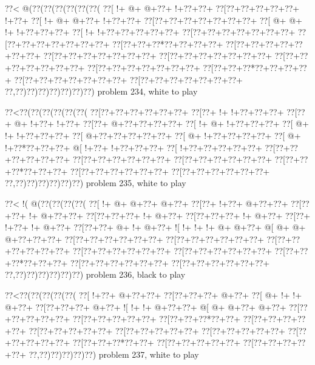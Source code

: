 \vbox{\vbox{\goo
\0??<\- @(\0??(\0??(\0??(\0??(\0??(\0??(
\0??[\- !+\- @+\- @+\0??+\- !+\0??+\0??+
\0??[\0??+\0??+\0??+\0??+\0??+\- !+\0??+
\0??[\- !+\- @+\- @+\0??+\- !+\0??+\0??+
\0??[\0??+\0??+\0??+\0??+\0??+\0??+\0??+
\0??[\- @+\- @+\- !+\- !+\0??+\0??+\0??+
\0??[\- !+\- !+\0??+\0??+\0??+\0??+\0??+
\0??[\0??+\0??+\0??+\0??+\0??+\0??+\0??+
\0??[\0??+\0??+\0??+\0??+\0??+\0??+\0??+
\0??[\0??+\0??+\0??*\0??+\0??+\0??+\0??+
\0??[\0??+\0??+\0??+\0??+\0??+\0??+\0??+
\0??[\0??+\0??+\0??+\0??+\0??+\0??+\0??+
\0??[\0??+\0??+\0??+\0??+\0??+\0??+\0??+
\0??[\0??+\0??+\0??+\0??+\0??+\0??+\0??+
\0??[\0??+\0??+\0??+\0??+\0??+\0??+\0??+
\0??[\0??+\0??+\0??*\0??+\0??+\0??+\0??+
\0??[\0??+\0??+\0??+\0??+\0??+\0??+\0??+
\0??[\0??+\0??+\0??+\0??+\0??+\0??+\0??+
\0??,\0??)\0??)\0??)\0??)\0??)\0??)\0??)
}
\hfil problem 234, white to play\hfil\break
}

\vbox{\vbox{\goo
\0??<\0??(\0??(\0??(\0??(\0??(\0??(
\0??[\0??+\0??+\0??+\0??+\0??+\0??+
\0??[\0??+\- !+\- !+\0??+\0??+\0??+
\0??[\0??+\- @+\- !+\0??+\- !+\0??+
\0??[\0??+\- @+\0??+\0??+\0??+\0??+
\0??[\- !+\- @+\- !+\0??+\0??+\0??+
\0??[\- @+\- !+\- !+\0??+\0??+\0??+
\0??[\- @+\0??+\0??+\0??+\0??+\0??+
\0??[\- @+\- !+\0??+\0??+\0??+\0??+
\0??[\- @+\- !+\0??*\0??+\0??+\0??+
\- @[\- !+\0??+\- !+\0??+\0??+\0??+
\0??[\- !+\0??+\0??+\0??+\0??+\0??+
\0??[\0??+\0??+\0??+\0??+\0??+\0??+
\0??[\0??+\0??+\0??+\0??+\0??+\0??+
\0??[\0??+\0??+\0??+\0??+\0??+\0??+
\0??[\0??+\0??+\0??*\0??+\0??+\0??+
\0??[\0??+\0??+\0??+\0??+\0??+\0??+
\0??[\0??+\0??+\0??+\0??+\0??+\0??+
\0??,\0??)\0??)\0??)\0??)\0??)\0??)
}
\hfil problem 235, white to play\hfil\break
}

\vbox{\vbox{\goo
\0??<\- !(\- @(\0??(\0??(\0??(\0??(
\0??[\- !+\- @+\- @+\0??+\- @+\0??+
\0??[\0??+\- !+\0??+\- @+\0??+\0??+
\0??[\0??+\0??+\- !+\- @+\0??+\0??+
\0??[\0??+\0??+\0??+\- !+\- @+\0??+
\0??[\0??+\0??+\0??+\- !+\- @+\0??+
\0??[\0??+\- !+\0??+\- !+\- @+\0??+
\0??[\0??+\0??+\- @+\- !+\- @+\0??+
\- ![\- !+\- !+\- !+\- @+\- @+\0??+
\- @[\- @+\- @+\- @+\0??+\0??+\0??+
\0??[\0??+\0??+\0??+\0??+\0??+\0??+
\0??[\0??+\0??+\0??+\0??+\0??+\0??+
\0??[\0??+\0??+\0??+\0??+\0??+\0??+
\0??[\0??+\0??+\0??+\0??+\0??+\0??+
\0??[\0??+\0??+\0??+\0??+\0??+\0??+
\0??[\0??+\0??+\0??*\0??+\0??+\0??+
\0??[\0??+\0??+\0??+\0??+\0??+\0??+
\0??[\0??+\0??+\0??+\0??+\0??+\0??+
\0??,\0??)\0??)\0??)\0??)\0??)\0??)
}
\hfil problem 236, black to play\hfil\break
}

\vbox{\vbox{\goo
\0??<\0??(\0??(\0??(\0??(\0??(
\0??[\- !+\0??+\- @+\0??+\0??+
\0??[\0??+\0??+\0??+\- @+\0??+
\0??[\- @+\- !+\- !+\- @+\0??+
\0??[\0??+\0??+\0??+\- @+\0??+
\- ![\- !+\- !+\- @+\0??+\0??+
\- @[\- @+\- @+\0??+\- @+\0??+
\0??[\0??+\0??+\0??+\0??+\0??+
\0??[\0??+\0??+\0??+\0??+\0??+
\0??[\0??+\0??+\0??*\0??+\0??+
\0??[\0??+\0??+\0??+\0??+\0??+
\0??[\0??+\0??+\0??+\0??+\0??+
\0??[\0??+\0??+\0??+\0??+\0??+
\0??[\0??+\0??+\0??+\0??+\0??+
\0??[\0??+\0??+\0??+\0??+\0??+
\0??[\0??+\0??+\0??*\0??+\0??+
\0??[\0??+\0??+\0??+\0??+\0??+
\0??[\0??+\0??+\0??+\0??+\0??+
\0??,\0??)\0??)\0??)\0??)\0??)
}
\hfil problem 237, white to play\hfil\break
}

